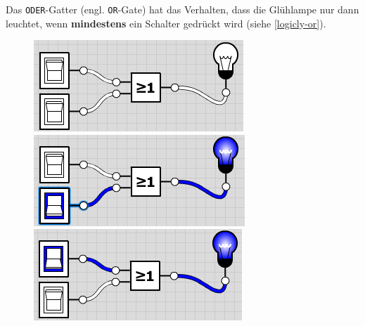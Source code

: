 Das \texttt{ODER}-Gatter (engl. \texttt{OR}-Gate) hat das Verhalten, dass die Glühlampe nur dann leuchtet, wenn \textbf{mindestens} ein Schalter gedrückt wird (siehe \autoref{logicly-or}).

\begin{figure}[htb]
\centering
\begin{minipage}{0.225\textwidth}
\includegraphics[width=\textwidth]{./or/or_off_off}
\end{minipage}
\begin{minipage}{0.225\textwidth}
\includegraphics[width=\textwidth]{./or/or_off_on}
\end{minipage}
\begin{minipage}{0.225\textwidth}
\includegraphics[width=\textwidth]{./or/or_on_off}
\end{minipage}
\begin{minipage}{0.225\textwidth}

\end{minipage}
\end{figure}
